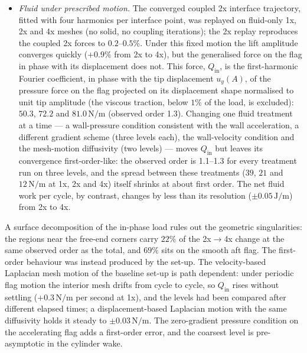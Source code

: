 \begin{itemize}
	\item \emph{Fluid under prescribed motion.} The converged coupled 2x interface trajectory, fitted with four harmonics per interface point, was replayed on fluid-only 1x, 2x and 4x meshes (no solid, no coupling iterations); the 2x replay reproduces the coupled 2x forces to $0.2$--$0.5\%$. Under this fixed motion the lift amplitude converges quickly ($+0.9\%$ from 2x to 4x), but the generalised force on the flag in phase with its displacement does not. This force, $Q_\mathrm{in}$, is the first-harmonic Fourier coefficient, in phase with the tip displacement $u_y(A)$, of the pressure force on the flag projected on its displacement shape normalised to unit tip amplitude (the viscous traction, below $1\%$ of the load, is excluded): $50.3$, $72.2$ and $81.0\,\mathrm{N/m}$ (observed order 1.3). Changing one fluid treatment at a time --- a wall-pressure condition consistent with the wall acceleration, a different gradient scheme (three levels each), the wall-velocity condition and the mesh-motion diffusivity (two levels) --- moves $Q_\mathrm{in}$ but leaves its convergence first-order-like: the observed order is 1.1--1.3 for every treatment run on three levels, and the spread between these treatments ($39$, $21$ and $12\,\mathrm{N/m}$ at 1x, 2x and 4x) itself shrinks at about first order. The net fluid work per cycle, by contrast, changes by less than its resolution ($\pm0.05\,\mathrm{J/m}$) from 2x to 4x.
\end{itemize}
A surface decomposition of the in-phase load rules out the geometric singularities: the regions near the free-end corners carry $22\%$ of the 2x$\to$4x change at the same observed order as the total, and $69\%$ sits on the smooth aft flag.
The first-order behaviour was instead produced by the set-up.
The velocity-based Laplacian mesh motion of the baseline set-up is path dependent: under periodic flag motion the interior mesh drifts from cycle to cycle, so $Q_\mathrm{in}$ rises without settling ($+0.3\,\mathrm{N/m}$ per second at 1x), and the levels had been compared after different elapsed times; a displacement-based Laplacian motion with the same diffusivity holds it steady to $\pm0.03\,\mathrm{N/m}$.
The zero-gradient pressure condition on the accelerating flag adds a first-order error, and the coarsest level is pre-asymptotic in the cylinder wake.
